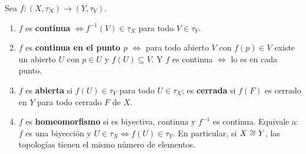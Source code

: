 \begin{teorema}[H4. Funciones]
Sea $f:(X,\tau_X)\to(Y,\tau_Y)$.
\begin{enumerate}[label=(\roman*),leftmargin=1.9em]
\item $f$ es \textbf{continua} $\iff f^{-1}(V)\in\tau_X$ para todo $V\in\tau_Y$.
\item $f$ es \textbf{continua en el punto $p$} $\iff$ para todo abierto $V$ con $f(p)\in V$ existe un abierto $U$ con
$p\in U$ y $f(U)\subseteq V$. Y $f$ es continua $\iff$ lo es en cada punto.
\item $f$ es \textbf{abierta} si $f(U)\in\tau_Y$ para todo $U\in\tau_X$; es \textbf{cerrada} si $f(F)$ es cerrado en
$Y$ para todo cerrado $F$ de $X$.
\item $f$ es \textbf{homeomorfismo} si es biyectiva, continua y $f^{-1}$ es continua. Equivale a: $f$ es una biyección
y $U\in\tau_X\iff f(U)\in\tau_Y$. En particular, si $X\cong Y$, las topologías tienen el mismo número de elementos.
\end{enumerate}
\end{teorema}
